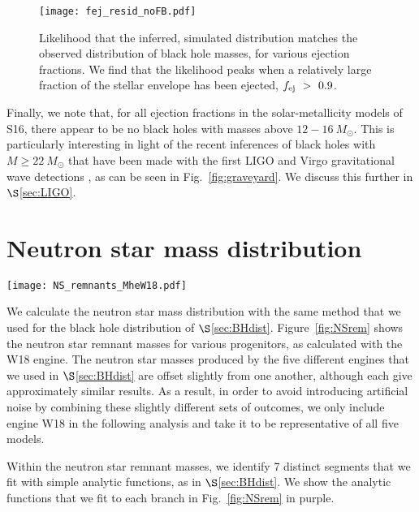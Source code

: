 \documentclass[]{emulateapj}
\newcommand{\Ms}{M_{\odot}}
\newcommand{\fe}{f_{\rm ej}}
\begin{document}
\begin{figure}[ht]
\centering
\texttt{[image: fej\_resid\_noFB.pdf]}
\caption{\label{fig:resids} Likelihood that the inferred, simulated distribution matches the observed distribution of black hole masses, for various ejection fractions. We find that the likelihood peaks when a relatively large fraction of the stellar envelope has been ejected, $\fe~>~0.9$.}
\end{figure}

Finally, we note that, for all ejection fractions in the solar-metallicity models of S16, there appear to be no black holes with masses above $12-16~\Ms$. This is particularly interesting in light of the recent inferences of black holes with $M\ge22~\Ms$ that have been made with the first LIGO and Virgo gravitational wave detections \citep{Abbott2016b, Abbott2016, Abbott2017, LIGOVirgo2017}, as can be seen in Fig.~\ref{fig:graveyard}. We discuss this further in $\S$\ref{sec:LIGO}.

\section{Neutron star mass distribution}
\label{sec:NSdist}
\begin{figure*}[ht]
\centering
\texttt{[image: NS\_remnants\_MheW18.pdf]}
\caption{\label{fig:NSrem} Neutron star baryonic masses as a function of the progenitor mass, for engine W18. We identify 7 distinct branches in this distribution. The analytic functions that we fit to each branch are shown in purple.}
\end{figure*}

We calculate the neutron star mass distribution with the same method that we used for the black hole distribution of $\S$\ref{sec:BHdist}. Figure~\ref{fig:NSrem} shows the neutron star remnant masses for various progenitors, as calculated with the W18 engine. The neutron star masses produced by the five different engines that we used in $\S$\ref{sec:BHdist} are offset slightly from one another, although each give approximately similar results. As a result, in order to avoid introducing artificial noise by combining these slightly different sets of outcomes, we only include engine W18 in the following analysis and take it to be representative of all five models.

Within the neutron star remnant masses, we identify 7 distinct segments that we fit with simple analytic functions, as in $\S$\ref{sec:BHdist}. We show the analytic functions that we fit to each branch in Fig.~\ref{fig:NSrem} in purple.
\end{document}
